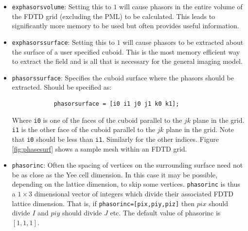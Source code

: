 \documentclass[a4paper, 12pt]{article}
\begin{document}
\begin{itemize}
		\item \verb+exphasorsvolume+: Setting this to $1$ will cause phasors
		in the entire volume of the FDTD grid (excluding the PML) to be
		calculated. This leads to significantly more memory to be used but
		often provides useful information.
		\item \verb+exphasorssurface+: Setting this to $1$ will cause phasors
		to be extracted about the surface of a user specified cuboid. This
		is the most memory efficient way to extract the field and is all
		that is necessary for the general imaging model.
		\item \verb+phasorssurface+: Specifies the cuboid surface where the phasors
		should be extracted. Should be specified as:
		\begin{verbatim}
			phasorsurface = [i0 i1 j0 j1 k0 k1];
		\end{verbatim}
		Where \verb+i0+ is one of the faces of the cuboid parallel to the $jk$
		plane in the grid. \verb+i1+ is the other face of the cuboid parallel to the $jk$
		plane in the grid. Note that \verb+i0+ should be less than
		\verb+i1+. Similarly for the other indices. Figure \ref{fig:phasesurf}
		shows a sample mesh within an FDTD grid.
		\item \verb+phasorinc+: Often the spacing of vertices on the
		surrounding surface need not be as close as the Yee cell
		dimension. In this case it may be possible, depending on the lattice
		dimension, to skip some vertices. \verb+phasorinc+ is thus a
		$1\times 3$ dimensional vector of integers which divide their
		associated FDTD lattice dimension. That is, if
		\verb+phasorinc=[pix,piy,piz]+ then $pix$ should divide $I$ and
		$piy$ should divide $J$ etc. The default value of phasorinc is $[1,1,1]$.


\end{itemize}
\end{document}
